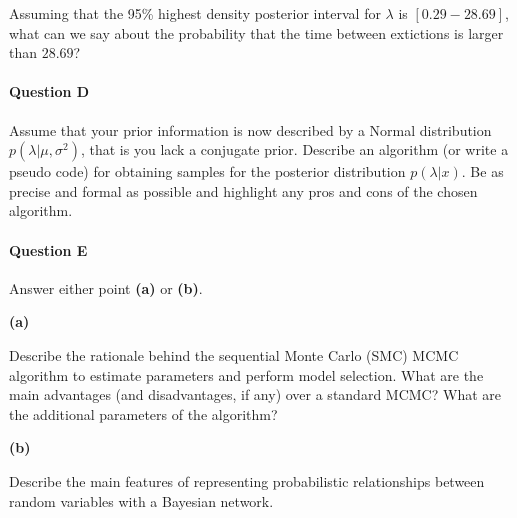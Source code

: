 Assuming that the 95\% highest density posterior interval for $\lambda$ is $[0.29 - 28.69]$, what can we say about the probability that the time between extictions is larger than $28.69$? 

\paragraph{Question D}

Assume that your prior information is now described by a Normal distribution $p(\lambda|\mu, \sigma^2)$, that is you lack a conjugate prior.
Describe an algorithm (or write a pseudo code) for obtaining samples for the posterior distribution $p(\lambda | x)$.
Be as precise and formal as possible and highlight any pros and cons of the chosen algorithm.

\paragraph{Question E}

Answer either point \textbf{(a)} or \textbf{(b)}.

\textbf{(a)}

Describe the rationale behind the sequential Monte Carlo (SMC) MCMC algorithm to estimate parameters and perform model selection.
What are the main advantages (and disadvantages, if any) over a standard MCMC? What are the additional parameters of the algorithm? 

\textbf{(b)}

Describe the main features of representing probabilistic relationships between random variables with a Bayesian network.


